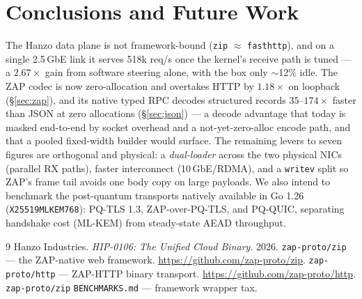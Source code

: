 \documentclass[11pt,twocolumn]{article}
\begin{document}
\section{Conclusions and Future Work}
The Hanzo data plane is not framework-bound (\texttt{zip} $\approx$
\texttt{fasthttp}), and on a single 2.5\,GbE link it serves 518k req/s once the
kernel's receive path is tuned --- a $2.67\times$ gain from software steering
alone, with the box only $\sim$12\% idle. The ZAP codec is now
zero-allocation and overtakes HTTP by $1.18\times$ on loopback (\S\ref{sec:zap}),
and its native typed RPC decodes structured records $35$--$174\times$ faster than
JSON at zero allocations (\S\ref{sec:json}) --- a decode advantage that today is
masked end-to-end by socket overhead and a not-yet-zero-alloc encode path, and
that a pooled fixed-width builder would surface. The remaining levers to seven
figures are orthogonal and physical: a \emph{dual-loader} across the two physical
NICs (parallel RX paths), faster interconnect (10\,GbE/RDMA), and a
\texttt{writev} split so ZAP's frame tail avoids one body copy on large payloads.
We also intend to benchmark the
post-quantum transports natively available in Go 1.26
(\texttt{X25519MLKEM768}): PQ-TLS 1.3, ZAP-over-PQ-TLS, and PQ-QUIC, separating
handshake cost (ML-KEM) from steady-state AEAD throughput.

\begin{thebibliography}{9}
 Hanzo Industries. \textit{HIP-0106: The Unified Cloud Binary}. 2026.
 \texttt{zap-proto/zip} --- the ZAP-native web framework. \url{https://github.com/zap-proto/zip}.
 \texttt{zap-proto/http} --- ZAP-HTTP binary transport. \url{https://github.com/zap-proto/http}.
 \texttt{zap-proto/zip} \texttt{BENCHMARKS.md} --- framework wrapper tax.
\end{thebibliography}
\end{document}
